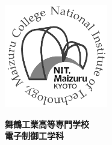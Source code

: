 \vfill
\begin{center}
    \includegraphics[width=45mm]{figure/logo_maizuru_gray.pdf}
\end{center}
\vspace{0.25zh}
\begin{center}
    {\fontsize{22pt}{0pt}\selectfont\bf{舞鶴工業高等専門学校}}\\[1zh]
    {\fontsize{22pt}{0pt}\selectfont\bf{電子制御工学科}}
\end{center}


\thispagestyle{empty}
